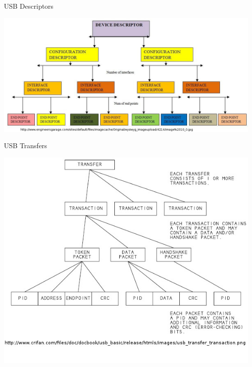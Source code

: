 \documentclass[pdf]{beamer}
\begin{document}
\begin{frame}{USB Descriptors}
  \begin{center}
    \includegraphics[scale=0.3]{img/descriptors.jpg}
  \end{center}
\end{frame}

\begin{frame}{USB Transfers}
  \begin{center}
    \includegraphics[scale=0.33]{img/usb_transfer.jpg}
  \end{center}
\end{frame}
\end{document}

